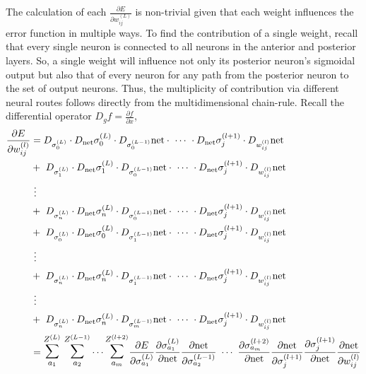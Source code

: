 \documentclass{ib-assignment}
\newcommand{\Sum}{\mathlarger{\mathlarger{\sum}}}
\begin{document}
The calculation of each \(\frac{\partial E}{\partial w_{ij}^{(L)}}\) is non-trivial given that each weight influences the error function in multiple ways.  To find the contribution of a single weight, recall that every single neuron is connected to all neurons in the anterior and posterior layers. So, a single weight will influence not only its posterior neuron’s sigmoidal output but also that of every neuron for any path from the posterior neuron to the set of output neurons. Thus, the multiplicity of contribution via different neural routes follows directly from the multidimensional chain-rule. Recall the differential operator \(D_g f=\frac{\partial f}{\partial x}\),
\begin{equation*}
	\begin{aligned}
    \frac{\partial E}{\partial w_{ij}^{(l)}} &= D_{\sigma_0^{(L)}}\cdot D_{\mathrm{net}} \sigma_0^{(L)} \cdot D_{\sigma_0^{(L-1)}}\mathrm{net}\cdot \  \cdots \  \cdot  D_{\mathrm{net}} \sigma_j^{(l+1)} \cdot D_{w_{ij}^{(l)}}\mathrm{net} \\
    &+\  D_{\sigma_1^{(L)}}\cdot D_{\mathrm{net}} \sigma_1^{(L)} \cdot D_{\sigma_0^{(L-1)}}\mathrm{net}\cdot\  \cdots \  \cdot  D_{\mathrm{net}} \sigma_j^{(l+1)} \cdot D_{w_{ij}^{(l)}}\mathrm{net} \\
    &\ \vdots\\
    &+\  D_{\sigma_n^{(L)}}\cdot D_{\mathrm{net}} \sigma_n^{(L)} \cdot D_{\sigma_0^{(L-1)}}\mathrm{net}\cdot \  \cdots \  \cdot  D_{\mathrm{net}} \sigma_j^{(l+1)} \cdot D_{w_{ij}^{(l)}}\mathrm{net} \\
        &+\  D_{\sigma_0^{(L)}}\cdot D_{\mathrm{net}} \sigma_0^{(L)} \cdot D_{\sigma_1^{(L-1)}}\mathrm{net}\cdot \  \cdots \  \cdot  D_{\mathrm{net}} \sigma_j^{(l+1)} \cdot D_{w_{ij}^{(l)}}\mathrm{net} \\
            &\ \vdots\\
        &+\  D_{\sigma_n^{(L)}}\cdot D_{\mathrm{net}} \sigma_n^{(L)} \cdot D_{\sigma_1^{(L-1)}}\mathrm{net}\cdot \ \cdots \  \cdot  D_{\mathrm{net}} \sigma_j^{(l+1)} \cdot D_{w_{ij}^{(l)}}\mathrm{net} \\
                &\ \vdots \\
                        &+\  D_{\sigma_n^{(L)}}\cdot D_{\mathrm{net}} \sigma_n^{(L)} \cdot D_{\sigma_m^{(L-1)}}\mathrm{net}\cdot \ \cdots \ \cdot  D_{\mathrm{net}} \sigma_j^{(l+1)} \cdot D_{w_{ij}^{(l)}}\mathrm{net} \\
                        &= \Sum_{a_1}^{Z^{(L)}}\ \Sum_{a_2}^{Z^{(L-1)}} \cdots \Sum_{a_m}^{Z^{(l+2)}} \frac{\partial E}{\partial \sigma_{a_1}^{(L)}}\frac{\partial \sigma_{a_1}^{(L)}}{\partial \mathrm{net}} \frac{\partial \mathrm{net}}{\partial \sigma_{a_2}^{(L-1)}} \ \cdots\ \frac{\partial \sigma_{a_m}^{(l+2)}}{\partial \mathrm{net}}\frac{\partial \mathrm{net}}{\partial \sigma_{j}^{(l+1)}}  \frac{\partial \sigma_{j}^{(l+1)}}{\partial \mathrm{net}} \frac{\partial \mathrm{net}}{\partial w_{ij}^{(l)}}
	\end{aligned}
\end{equation*} %
\end{document}
